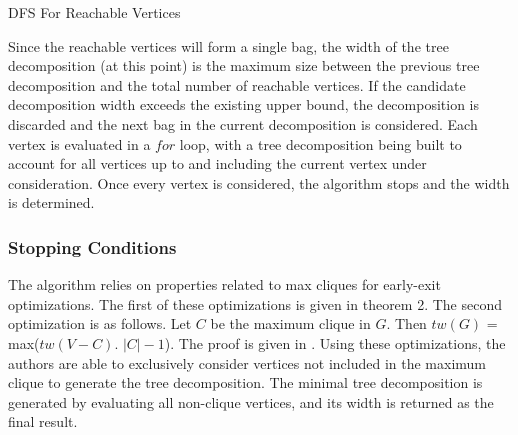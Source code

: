 \documentclass[12pt,conference]{IEEEtran}
\theoremstyle{plain}
\begin{document}
\begin{algorithm}[t]
  \caption{DFS For Reachable Vertices}
  \label{dfs_reachable_v}
  \begin{algorithmic}[1]
    \Else
    \EndIf
  \EndProcedure
  \State{}
      \EndIf
    \EndFor
      \Else
      \EndIf
    \Else
    \EndIf
  \EndWhile
  \EndProcedure
  \end{algorithmic}
\end{algorithm}

Since the reachable vertices will form a single bag, the width of the tree decomposition (at this point) is the maximum size between the previous tree decomposition and the total number of reachable vertices. If the candidate decomposition width exceeds the existing upper bound, the decomposition is discarded and the next bag in the current decomposition is considered. Each vertex is evaluated in a $for$ loop, with a tree decomposition being built to account for all vertices up to and including the current vertex under consideration. Once every vertex is considered, the algorithm stops and the width is determined. 

\subsubsection{Stopping Conditions}

The algorithm relies on properties related to max cliques for early-exit optimizations. The first of these optimizations is given in theorem 2. The second optimization is as follows. Let $C$ be the maximum clique in $G$. Then $tw(G)$ = max($tw(V-C)$. $|C|-1$). The proof is given in \cite{bodlaender-2012}. Using these optimizations, the authors are able to exclusively consider vertices not included in the maximum clique to generate the tree decomposition. The minimal tree decomposition is generated by evaluating all non-clique vertices, and its width is returned as the final result.
\end{document}
